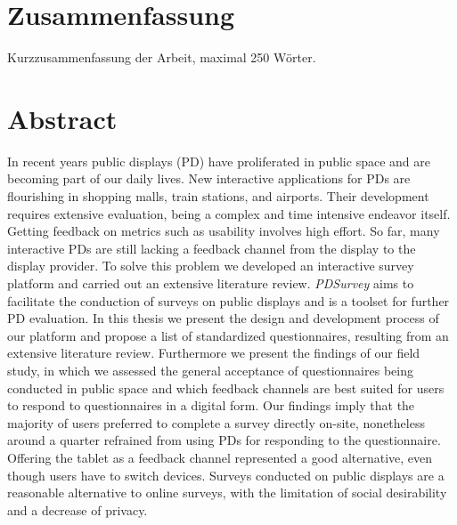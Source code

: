 
\section*{Zusammenfassung}

	Kurzzusammenfassung der Arbeit, maximal 250 W\"orter.

\section*{Abstract}

	In recent years public displays (PD) have proliferated in public space and are becoming part of our daily lives. New interactive applications for PDs are flourishing in shopping malls, train stations, and airports. Their development requires extensive evaluation, being a complex and time intensive endeavor itself. Getting feedback on metrics such as usability involves high effort. So far, many interactive PDs are still lacking a feedback channel from the display to the display provider. To solve this problem we developed an interactive survey platform and carried out an extensive literature review.
	\textit{PDSurvey} aims to facilitate the conduction of surveys on public displays and is a toolset for further PD evaluation. In this thesis we present the design and development process of our platform and propose a list of standardized questionnaires, resulting from an extensive literature review. Furthermore we present the findings of our field study, in which we assessed the general acceptance of questionnaires being conducted in public space and which feedback channels are best suited for users to respond to questionnaires in a digital form.
	Our findings imply that the majority of users preferred to complete a survey directly on-site, nonetheless around a quarter refrained from using PDs for responding to the questionnaire. Offering the tablet as a feedback channel represented a good alternative, even though users have to switch devices. Surveys conducted on public displays are a reasonable alternative to online surveys, with the limitation of social desirability and a decrease of privacy.
	








